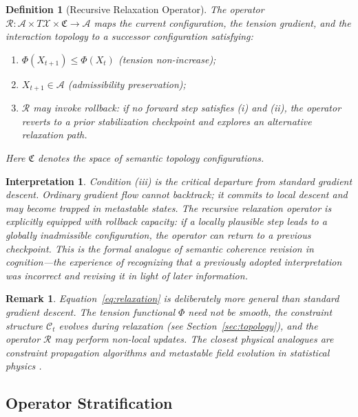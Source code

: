 \documentclass[11pt, a4paper]{article}
\theoremstyle{srn}
\newtheorem{definition}{Definition}[section]
\theoremstyle{srnremark}
\newtheorem{interpretation}{Interpretation}[section]
\newtheorem{remark}{Remark}[section]
\newcommand{\Aspace}{\mathcal{A}}           %
\newcommand{\Cstruct}{\mathcal{C}}           %
\newcommand{\Rop}{\mathcal{R}}           %
\newcommand{\Phiten}{\varPhi}            %
\begin{document}
\begin{definition}[Recursive Relaxation Operator]
\label{def:relaxation}
The operator $\Rop : \Aspace \times T\mathcal{X} \times \mathfrak{C} \to \Aspace$
maps the current configuration, the tension gradient, and the
interaction topology to a successor configuration satisfying:
\begin{enumerate}
  \item[(i)] $\Phiten(X_{t+1}) \leq \Phiten(X_t)$ (tension non-increase);
  \item[(ii)] $X_{t+1} \in \Aspace$ (admissibility preservation);
  \item[(iii)] $\Rop$ may invoke rollback: if no forward step satisfies
    (i) and (ii), the operator reverts to a prior stabilization
    checkpoint and explores an alternative relaxation path.
\end{enumerate}
Here $\mathfrak{C}$ denotes the space of semantic topology
configurations.
\end{definition}

\begin{interpretation}
Condition (iii) is the critical departure from standard gradient
descent.
Ordinary gradient flow cannot backtrack; it commits to local descent
and may become trapped in metastable states.
The recursive relaxation operator is explicitly equipped with rollback
capacity: if a locally plausible step leads to a globally inadmissible
configuration, the operator can return to a previous checkpoint.
This is the formal analogue of semantic coherence revision in
cognition---the experience of recognizing that a previously adopted
interpretation was incorrect and revising it in light of later
information.
\end{interpretation}

\begin{remark}
Equation~\eqref{eq:relaxation} is deliberately more general than
standard gradient descent.
The tension functional $\Phiten$ need not be smooth, the constraint
structure $\Cstruct_t$ evolves during relaxation (see
Section~\ref{sec:topology}), and the operator $\Rop$ may perform
non-local updates.
The closest physical analogues are \emph{constraint propagation
algorithms} and \emph{metastable field evolution} in statistical
physics \citep{parisi1988statistical, wilson1974renormalization}.
\end{remark}


\subsection{Operator Stratification}
\end{document}
